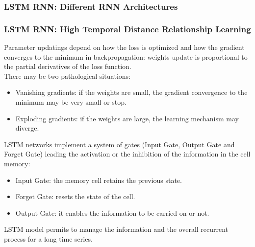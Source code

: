 \documentclass[aspectratio=1610]{beamer}
\begin{document}
\begin{frame}
\frametitle{LSTM RNN: Different RNN Architectures}	
\hspace{2cm}
\end{frame}
\begin{frame}
\frametitle{LSTM RNN: High Temporal Distance Relationship Learning}
Parameter updatings depend on how the loss is optimized and how the gradient converges to the minimum in backpropagation: weights update is proportional to the partial derivatives of the loss function.\\
There may be two pathological situations:
\begin{itemize}
	\item Vanishing gradients: if the weights are small, the gradient convergence to the minimum may be very small or stop.
	\item Exploding gradients: if the weights are large, the learning mechanism may diverge.
\end{itemize}
LSTM networks implement a system of gates (Input Gate, Output Gate and Forget Gate) leading the activation or the inhibition of the information in the cell memory:
\begin{itemize}
	\item Input Gate: the memory cell retains the previous state.
	\item Forget Gate: resets the state of the cell.
	\item Output Gate: it enables the information to be carried on or not.
\end{itemize}
LSTM model permits to manage the information and the overall recurrent process for a long time series.
\end{frame}
\end{document}
